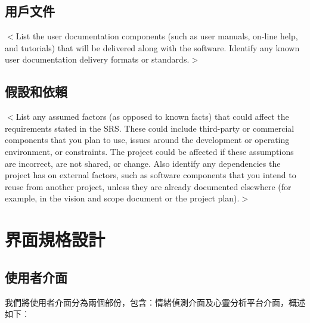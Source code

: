 \documentclass[12pt]{scrreprt}
\begin{document}
\section{用戶文件}
$<$List the user documentation components (such as user manuals, on-line help, 
and tutorials) that will be delivered along with the software. Identify any 
known user documentation delivery formats or standards.$>$
\section{假設和依賴}

$<$List any assumed factors (as opposed to known facts) that could affect the 
requirements stated in the SRS. These could include third-party or commercial 
components that you plan to use, issues around the development or operating 
environment, or constraints. The project could be affected if these assumptions 
are incorrect, are not shared, or change. Also identify any dependencies the 
project has on external factors, such as software components that you intend to 
reuse from another project, unless they are already documented elsewhere (for 
example, in the vision and scope document or the project plan).$>$


\chapter{界面規格設計}

\section{使用者介面}

我們將使用者介面分為兩個部份，包含︰情緒偵測介面及心靈分析平台介面，概述如下︰
\end{document}
